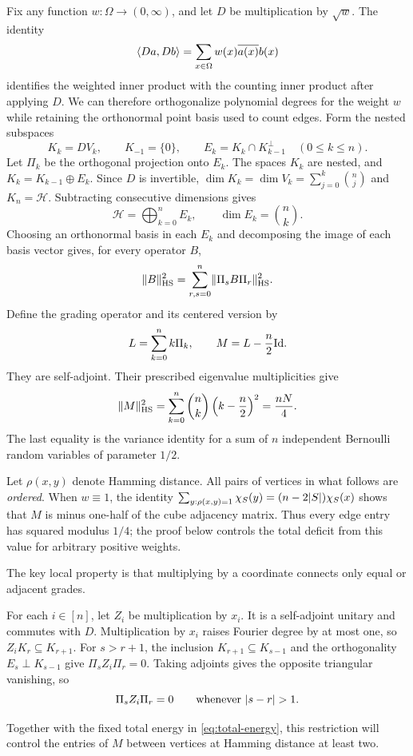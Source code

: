 Fix any function $w:\Omega\to(0,\infty)$, and let $D$ be multiplication
by $\sqrt w$. The identity
\[
 \langle Da,Db\rangle=\sum_{x\in\Omega}w(x)\overline{a(x)}b(x)
\]
identifies the weighted inner product with the counting inner product
after applying $D$. We can therefore orthogonalize polynomial degrees for the weight
$w$ while retaining the orthonormal point basis used to count edges.
Form the nested subspaces
\[
 K_k=DV_k,\qquad K_{-1}=\{0\},\qquad
 E_k=K_k\cap K_{k-1}^{\perp}\quad(0\le k\le n).
\]
Let $\Pi_k$ be the orthogonal projection onto $E_k$. The spaces $K_k$
are nested, and $K_k=K_{k-1}\oplus E_k$. Since $D$ is invertible,
$\dim K_k=\dim V_k=\sum_{j=0}^k\binom nj$ and $K_n=\mathcal H$.
Subtracting consecutive dimensions gives
\[
\mathcal H=\bigoplus_{k=0}^n E_k,\qquad
 \dim E_k=\binom nk.
\]
Choosing an orthonormal basis in each $E_k$ and decomposing the image of
each basis vector gives, for every operator $B$,
\begin{equation}\label{eq:block-parseval}
 \lVert B\rVert_{\mathrm{HS}}^2
 =\sum_{r,s=0}^n\lVert \Pi_s B\Pi_r\rVert_{\mathrm{HS}}^2.
\end{equation}
Define the grading operator and its centered version by
\begin{equation}\label{eq:grading}
 L=\sum_{k=0}^n k\Pi_k,\qquad M=L-\frac n2\mathrm{Id}.
\end{equation}
They are self-adjoint. Their prescribed eigenvalue multiplicities give
\begin{equation}\label{eq:total-energy}
 \lVert M\rVert_{\mathrm{HS}}^2=\sum_{k=0}^n\binom nk\left(k-\frac n2\right)^2
 =\frac{nN}{4}.
\end{equation}
The last equality is the variance identity for a sum of $n$ independent
Bernoulli random variables of parameter $1/2$.

Let $\rho(x,y)$ denote Hamming distance. All pairs of vertices in what
follows are \emph{ordered}. When $w\equiv1$, the identity
$\sum_{y:\rho(x,y)=1}\chi_S(y)=(n-2\lvert S\rvert)\chi_S(x)$ shows that $M$ is
minus one-half of the cube adjacency matrix. Thus every edge entry has
squared modulus $1/4$; the proof below controls the total deficit from
this value for arbitrary positive weights.

The key local property is that multiplying by a coordinate connects
only equal or adjacent grades.

For each $i\in[n]$, let $Z_i$ be multiplication by $x_i$. It is a
self-adjoint unitary and commutes with $D$. Multiplication by $x_i$ raises
Fourier degree by at most one, so $Z_iK_r\subseteq K_{r+1}$.
For $s>r+1$, the inclusion $K_{r+1}\subseteq K_{s-1}$ and the
orthogonality $E_s\perp K_{s-1}$ give $\Pi_sZ_i\Pi_r=0$.
Taking adjoints gives the opposite triangular vanishing, so
\begin{equation}\label{eq:tridiagonal}
 \Pi_sZ_i\Pi_r=0\qquad\text{whenever }\lvert s-r\rvert>1.
\end{equation}

Together with the fixed total energy in \eqref{eq:total-energy}, this
restriction will control the entries of $M$ between vertices at Hamming
distance at least two.
